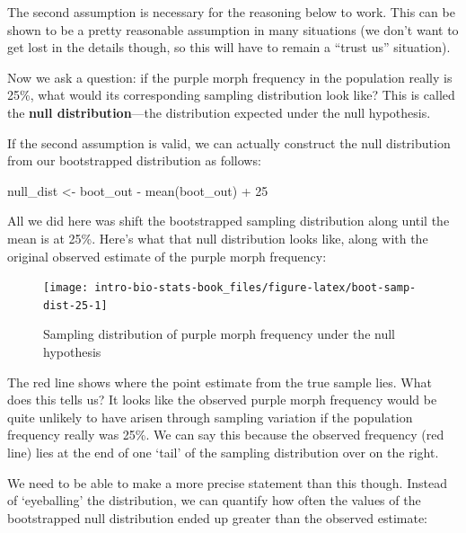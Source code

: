 \documentclass[
]{book}
\newenvironment{Shaded}{\begin{snugshade}}{\end{snugshade}}
\newcommand{\DecValTok}[1]{\textcolor[rgb]{0.00,0.00,0.81}{#1}}
\newcommand{\FunctionTok}[1]{\textcolor[rgb]{0.00,0.00,0.00}{#1}}
\newcommand{\NormalTok}[1]{#1}
\newcommand{\OtherTok}[1]{\textcolor[rgb]{0.56,0.35,0.01}{#1}}
\newcommand{\SpecialCharTok}[1]{\textcolor[rgb]{0.00,0.00,0.00}{#1}}
\begin{document}
The second assumption is necessary for the reasoning below to work. This can be shown to be a pretty reasonable assumption in many situations (we don't want to get lost in the details though, so this will have to remain a ``trust us'' situation).

Now we ask a question: if the purple morph frequency in the population really is 25\%, what would its corresponding sampling distribution look like? This is called the \textbf{null distribution}---the distribution expected under the null hypothesis.

If the second assumption is valid, we can actually construct the null distribution from our bootstrapped distribution as follows:

\begin{Shaded}
\begin{Highlighting}[]
\NormalTok{null\_dist }\OtherTok{\textless{}{-}}\NormalTok{ boot\_out }\SpecialCharTok{{-}} \FunctionTok{mean}\NormalTok{(boot\_out) }\SpecialCharTok{+} \DecValTok{25}
\end{Highlighting}
\end{Shaded}

All we did here was shift the bootstrapped sampling distribution along until the mean is at 25\%. Here's what that null distribution looks like, along with the original observed estimate of the purple morph frequency:

\begin{figure}

{\centering \texttt{[image: intro-bio-stats-book\_files/figure-latex/boot-samp-dist-25-1]} 

}

\caption{Sampling distribution of purple morph frequency under the null hypothesis}\label{fig:boot-samp-dist-25}
\end{figure}

The red line shows where the point estimate from the true sample lies. What does this tells us? It looks like the observed purple morph frequency would be quite unlikely to have arisen through sampling variation if the population frequency really was 25\%. We can say this because the observed frequency (red line) lies at the end of one `tail' of the sampling distribution over on the right.

We need to be able to make a more precise statement than this though. Instead of `eyeballing' the distribution, we can quantify how often the values of the bootstrapped null distribution ended up greater than the observed estimate:
\end{document}
